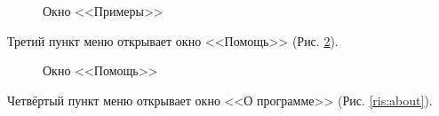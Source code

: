 \documentclass{article}
\begin{document}
\begin{figure}[!h]
\caption{Окно <<Примеры>>}
\label{ris:examples}
\end{figure}

Третий пункт меню открывает окно <<Помощь>> (Рис. \ref{ris:help}). 

\begin{figure}[!h]
\caption{Окно <<Помощь>>}
\label{ris:help}
\end{figure}

Четвёртый пункт меню открывает окно <<О программе>> (Рис. \ref{ris:about}).
\end{document}
